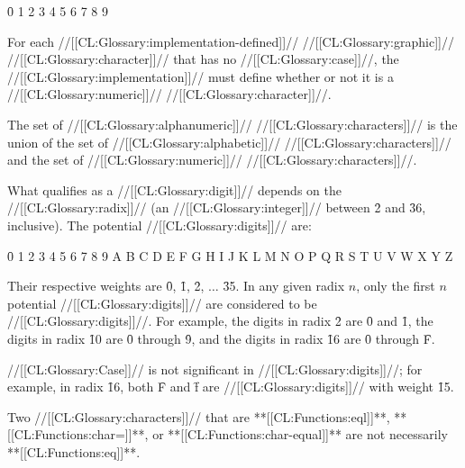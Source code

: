 \f{0 1 2 3 4 5 6 7 8 9}

For each //[[CL:Glossary:implementation-defined]]// //[[CL:Glossary:graphic]]// //[[CL:Glossary:character]]// 
that has no //[[CL:Glossary:case]]//, the //[[CL:Glossary:implementation]]// must define whether
or not it is a //[[CL:Glossary:numeric]]// //[[CL:Glossary:character]]//.

\endsubsubsection%


The set of //[[CL:Glossary:alphanumeric]]// //[[CL:Glossary:characters]]// is the union of 
    the set of //[[CL:Glossary:alphabetic]]// //[[CL:Glossary:characters]]// 
and the set of //[[CL:Glossary:numeric]]// //[[CL:Glossary:characters]]//.

\endsubsubsection%


What qualifies as a //[[CL:Glossary:digit]]// depends on the //[[CL:Glossary:radix]]// 
(an //[[CL:Glossary:integer]]// between \f{2} and \f{36}, inclusive).
The potential //[[CL:Glossary:digits]]// are:

\f{0 1 2 3 4 5 6 7 8 9 A B C D E F G H I J K L M N O P Q R S T U V W X Y Z}

Their respective weights are \f{0}, \f{1}, \f{2}, $\ldots$ \f{35}.
In any given radix $n$, only the first $n$ potential //[[CL:Glossary:digits]]// 
are considered to be //[[CL:Glossary:digits]]//.
For example,
the digits in radix \f{2}  are \f{0} and \f{1}, 
the digits in radix \f{10} are \f{0} through \f{9}, and
the digits in radix \f{16} are \f{0} through \f{F}.

//[[CL:Glossary:Case]]// is not significant in //[[CL:Glossary:digits]]//; 
for example, in radix \f{16}, both \f{F} and \f{f} 
are //[[CL:Glossary:digits]]// with weight \f{15}.









\endsubsubsection%

\endsubSection%




Two //[[CL:Glossary:characters]]// that are **[[CL:Functions:eql]]**, **[[CL:Functions:char=]]**, or **[[CL:Functions:char-equal]]** 
are not necessarily **[[CL:Functions:eq]]**.

